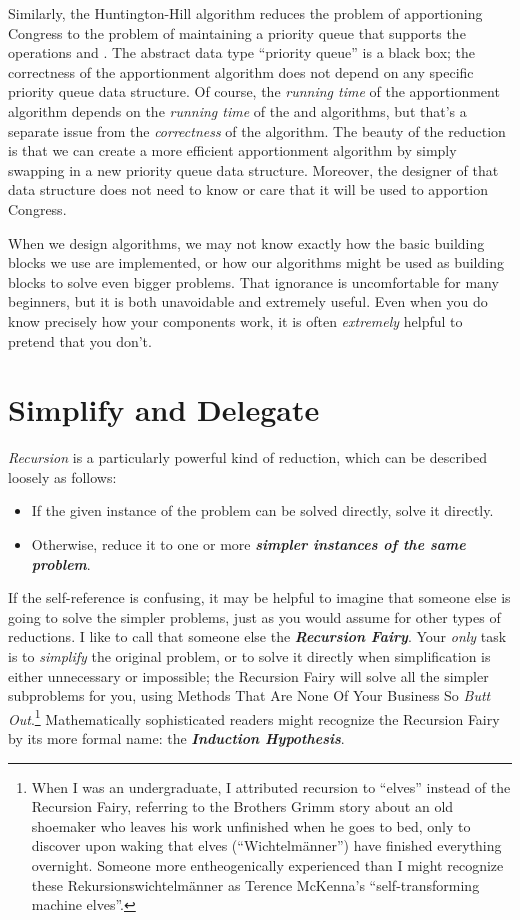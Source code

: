 Similarly, the Huntington-Hill algorithm reduces the problem of apportioning Congress to the problem of maintaining a priority queue that supports the operations  and . The abstract data type “priority queue” is a black box; the correctness of the apportionment algorithm does not depend on any specific priority queue data structure. Of course, the \emph{running time} of the apportionment algorithm depends on the \emph{running time} of the  and  algorithms, but that’s a separate issue from the \emph{correctness} of the algorithm. The beauty of the reduction is that we can create a more efficient apportionment algorithm by simply swapping in a new priority queue data structure. Moreover, the designer of that data structure does not need to know or care that it will be used to apportion Congress.

When we design algorithms, we may not know exactly how the basic building blocks we use are implemented, or how our algorithms might be used as building blocks to solve even bigger problems. That ignorance is uncomfortable for many beginners, but it is both unavoidable and extremely useful. Even when you do know precisely how your components work, it is often \emph{extremely} helpful to pretend that you don’t.

\section{Simplify and Delegate}
\label{sec:1.2}

\emph{Recursion} is a particularly powerful kind of reduction, which can be described loosely as follows:
\begin{itemize}
\item If the given instance of the problem can be solved directly, solve it directly.
\item Otherwise, reduce it to one or more \textbf{\textit{simpler instances of the same problem}}.
\end{itemize}
If the self-reference is confusing, it may be helpful to imagine that someone else is going to solve the simpler problems, just as you would assume for other types of reductions. I like to call that someone else the \textbf{\textit{Recursion Fairy}}. Your \emph{only} task is to \emph{simplify} the original problem, or to solve it directly when simplification is either unnecessary or impossible; the Recursion Fairy will solve all the simpler subproblems for you, using Methods That Are None Of Your Business So \emph{Butt Out}.\footnote{When I was an undergraduate, I attributed recursion to “elves” instead of the Recursion Fairy, referring to the Brothers Grimm story about an old shoemaker who leaves his work unfinished when he goes to bed, only to discover upon waking that elves (“Wichtelmänner”) have finished everything overnight. Someone more entheogenically experienced than I might recognize these Rekursionswichtelmänner as Terence McKenna’s “self-transforming machine elves”.} Mathematically sophisticated readers might recognize the Recursion Fairy by its more formal name: the \textbf{\textit{Induction Hypothesis}}.

